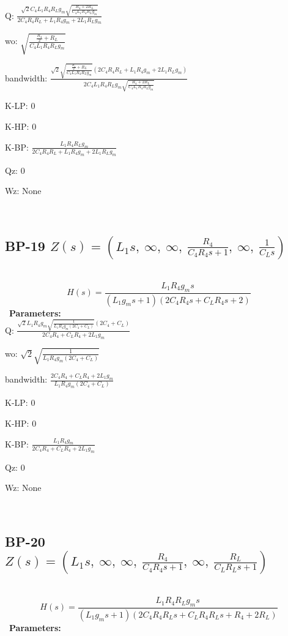 \documentclass{article}
\begin{document}
Q: $\frac{\sqrt{2} C_{4} L_{1} R_{4} R_{L} g_{m} \sqrt{\frac{R_{4} + 2 R_{L}}{C_{4} L_{1} R_{4} R_{L} g_{m}}}}{2 C_{4} R_{4} R_{L} + L_{1} R_{4} g_{m} + 2 L_{1} R_{L} g_{m}}$\ 

wo: $\sqrt{\frac{\frac{R_{4}}{2} + R_{L}}{C_{4} L_{1} R_{4} R_{L} g_{m}}}$\ 

bandwidth: $\frac{\sqrt{2} \sqrt{\frac{\frac{R_{4}}{2} + R_{L}}{C_{4} L_{1} R_{4} R_{L} g_{m}}} \left(2 C_{4} R_{4} R_{L} + L_{1} R_{4} g_{m} + 2 L_{1} R_{L} g_{m}\right)}{2 C_{4} L_{1} R_{4} R_{L} g_{m} \sqrt{\frac{R_{4} + 2 R_{L}}{C_{4} L_{1} R_{4} R_{L} g_{m}}}}$\ 

K-LP: $0$\ 

K-HP: $0$\ 

K-BP: $\frac{L_{1} R_{4} R_{L} g_{m}}{2 C_{4} R_{4} R_{L} + L_{1} R_{4} g_{m} + 2 L_{1} R_{L} g_{m}}$\ 

Qz: $0$\ 

Wz: $\text{None}$\ 

\ 

\subsection{BP-19 $Z(s) = \left( L_{1} s, \  \infty, \  \infty, \  \frac{R_{4}}{C_{4} R_{4} s + 1}, \  \infty, \  \frac{1}{C_{L} s}\right)$ } \ 
\textbf{\[H(s) = \frac{L_{1} R_{4} g_{m} s}{\left(L_{1} g_{m} s + 1\right) \left(2 C_{4} R_{4} s + C_{L} R_{4} s + 2\right)}\] } \ 
\textbf{Parameters:}\\ 

Q: $\frac{\sqrt{2} L_{1} R_{4} g_{m} \sqrt{\frac{1}{L_{1} R_{4} g_{m} \left(2 C_{4} + C_{L}\right)}} \left(2 C_{4} + C_{L}\right)}{2 C_{4} R_{4} + C_{L} R_{4} + 2 L_{1} g_{m}}$\ 

wo: $\sqrt{2} \sqrt{\frac{1}{L_{1} R_{4} g_{m} \left(2 C_{4} + C_{L}\right)}}$\ 

bandwidth: $\frac{2 C_{4} R_{4} + C_{L} R_{4} + 2 L_{1} g_{m}}{L_{1} R_{4} g_{m} \left(2 C_{4} + C_{L}\right)}$\ 

K-LP: $0$\ 

K-HP: $0$\ 

K-BP: $\frac{L_{1} R_{4} g_{m}}{2 C_{4} R_{4} + C_{L} R_{4} + 2 L_{1} g_{m}}$\ 

Qz: $0$\ 

Wz: $\text{None}$\ 

\ 

\subsection{BP-20 $Z(s) = \left( L_{1} s, \  \infty, \  \infty, \  \frac{R_{4}}{C_{4} R_{4} s + 1}, \  \infty, \  \frac{R_{L}}{C_{L} R_{L} s + 1}\right)$ } \ 
\textbf{\[H(s) = \frac{L_{1} R_{4} R_{L} g_{m} s}{\left(L_{1} g_{m} s + 1\right) \left(2 C_{4} R_{4} R_{L} s + C_{L} R_{4} R_{L} s + R_{4} + 2 R_{L}\right)}\] } \ 
\textbf{Parameters:}\\ 
\end{document}
